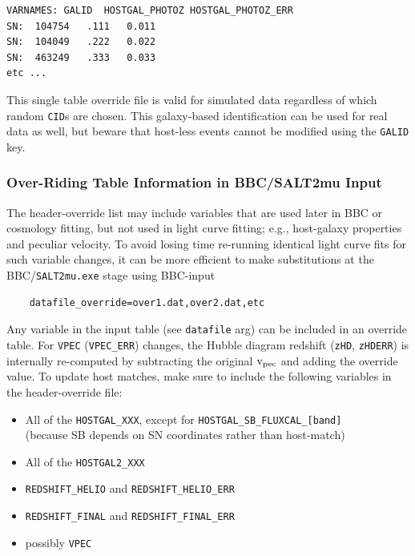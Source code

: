 \documentclass[12pt]{article}
\newcommand{\vpec}{{\rm v}_{\rm pec}}
\begin{document}
\begin{verbatim}                                                                                                   
VARNAMES: GALID  HOSTGAL_PHOTOZ HOSTGAL_PHOTOZ_ERR
SN:  104754   .111   0.011
SN:  104049   .222   0.022
SN:  463249   .333   0.033
etc ...
\end{verbatim}
This single table override file is valid for simulated data regardless of which
random {\tt CID}s are chosen. This galaxy-based identification can be used for real
data as well, but beware that host-less events cannot be modified using the {\tt GALID} key.


\subsubsection{Over-Riding Table Information in BBC/SALT2mu Input }
\label{sss:bbc_override}


The header-override list may include variables that are used later in 
BBC or cosmology fitting, but not used in light curve fitting;
e.g., host-galaxy properties and peculiar velocity. To avoid 
losing time re-running identical light curve fits for such variable changes,
it can be more efficient to make substitutions at the 
BBC/{\tt SALT2mu.exe} stage using BBC-input 
\vspace{-0.2cm}
\begin{verbatim}
    datafile_override=over1.dat,over2.dat,etc
\end{verbatim}
Any variable in the input table (see {\tt datafile} arg) can be
included in an override table.
For {\tt VPEC} ({\tt VPEC\_ERR}) changes, the Hubble diagram 
redshift ({\tt zHD}, {\tt zHDERR}) is internally re-computed by subtracting
the original $\vpec$ and adding the override value.
To update host matches, make sure to include the following variables
in the header-override file:
\vspace{-0.1cm}
\begin{itemize}[noitemsep]
   \item All of the {\tt HOSTGAL\_XXX},
            except for {\tt HOSTGAL\_SB\_FLUXCAL\_[band]} \\
     (because SB depends on SN coordinates rather than host-match)
   \item All of the {\tt HOSTGAL2\_XXX}
   \item {\tt REDSHIFT\_HELIO} and {\tt REDSHIFT\_HELIO\_ERR}
   \item {\tt REDSHIFT\_FINAL} and {\tt REDSHIFT\_FINAL\_ERR}
   \item possibly {\tt VPEC}
\end{itemize}
\end{document}
